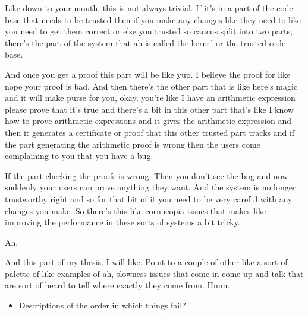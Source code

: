 Like down to your mouth, this is not always trivial. If it's in a part of the code base that needs to be trusted then if you make any changes like they need to like you need to get them correct or else you trusted so caucus split into two parts, there's the part of the system that ah is called the kernel or the trusted code base. 

And once you get a proof this part will be like yup. I believe the proof for like nope your proof is bad. And then there's the other part that is like here's magic and it will make purse for you, okay, you're like I have an arithmetic expression please prove that it's true and there's a bit in this other part that's like I know how to prove arithmetic expressions and it gives the arithmetic expression and then it generates a certificate or proof that this other trusted part tracks and if the part generating the arithmetic proof is wrong then the users come complaining to you that you have a bug. 

If the part checking the proofs is wrong. Then you don't see the bug and now suddenly your users can prove anything they want. And the system is no longer trustworthy right and so for that bit of it you need to be very careful with any changes you make. So there's this like cornucopia issues that makes like improving the performance in these sorts of systems a bit tricky. 

Ah. 

And this part of my thesis. I will like. Point to a couple of other like a sort of palette of like examples of ah, slowness issues that come in come up and talk that are sort of heard to tell where exactly they come from. Hmm. 




\begin{itemize}
\item Descriptions of the order in which things fail?
\end{itemize}
